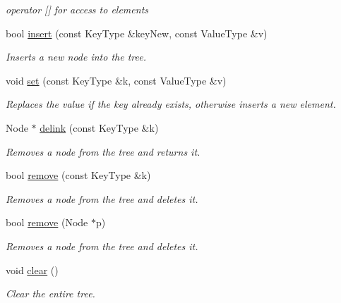 \begin{DoxyCompactItemize}
\begin{DoxyCompactList}\small\item\em operator \mbox{[}\mbox{]} for access to elements \end{DoxyCompactList}\item 
bool \hyperlink{classirr_1_1core_1_1map_af9f8f34cab620e3bdc1ae72715ab9d15}{insert} (const Key\+Type \&key\+New, const Value\+Type \&v)
\begin{DoxyCompactList}\small\item\em Inserts a new node into the tree. \end{DoxyCompactList}\item 
void \hyperlink{classirr_1_1core_1_1map_ae31213e9478dd259bdd79c7fd3249584}{set} (const Key\+Type \&k, const Value\+Type \&v)
\begin{DoxyCompactList}\small\item\em Replaces the value if the key already exists, otherwise inserts a new element. \end{DoxyCompactList}\item 
Node $\ast$ \hyperlink{classirr_1_1core_1_1map_a6f95533c709ef2dbe17148442aa26984}{delink} (const Key\+Type \&k)
\begin{DoxyCompactList}\small\item\em Removes a node from the tree and returns it. \end{DoxyCompactList}\item 
bool \hyperlink{classirr_1_1core_1_1map_a83d8a6261249668ae6a0f2bbd6e84c26}{remove} (const Key\+Type \&k)
\begin{DoxyCompactList}\small\item\em Removes a node from the tree and deletes it. \end{DoxyCompactList}\item 
bool \hyperlink{classirr_1_1core_1_1map_a8f8ee85b87b3764be03d78ba696e75f2}{remove} (Node $\ast$p)
\begin{DoxyCompactList}\small\item\em Removes a node from the tree and deletes it. \end{DoxyCompactList}\item 
\mbox{\label{classirr_1_1core_1_1map_a0f7e7fdbb5ec7794851e32c9716dace0}} 
void \hyperlink{classirr_1_1core_1_1map_a0f7e7fdbb5ec7794851e32c9716dace0}{clear} ()
\begin{DoxyCompactList}\small\item\em Clear the entire tree. \end{DoxyCompactList}\item 

\end{DoxyCompactItemize}
